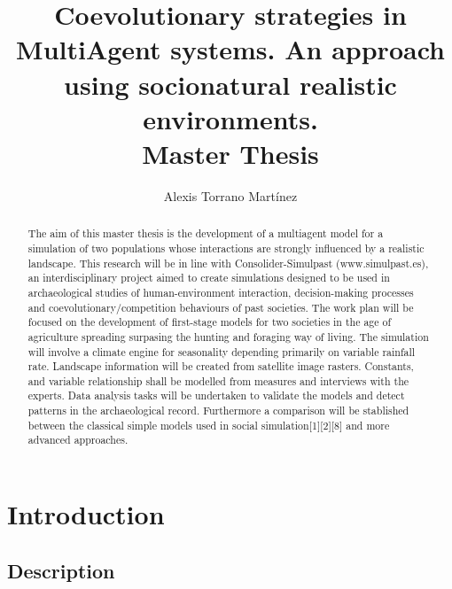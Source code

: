 \documentclass[11pt,oneside,a4paper,openright]{report}
\begin{document}
\title{Coevolutionary strategies in MultiAgent systems. An approach using socionatural realistic environments.\\
\small{Master Thesis}}
\author{Alexis Torrano Mart\'inez}
\maketitle
\newpage



\begin{abstract}
The aim of this master thesis is the development of a multiagent model for a simulation of two populations whose interactions are strongly influenced by a realistic landscape.
This research will be in line with Consolider-Simulpast (www.simulpast.es), an interdisciplinary project aimed to create simulations designed to be used in archaeological studies of human-environment interaction, decision-making processes and coevolutionary/competition behaviours of past societies.
The work plan will be focused on the development of first-stage models for two societies in the age of agriculture spreading surpasing the hunting and foraging way of living. The simulation will involve a climate engine for seasonality depending primarily on variable rainfall rate. Landscape information will be created from satellite image rasters. Constants, and variable relationship shall be modelled from measures and interviews with the experts. Data analysis tasks will be undertaken to validate the models and detect patterns in the archaeological record. Furthermore a comparison will be stablished between the classical simple models used in social simulation[1][2][8] and more advanced approaches.
\end{abstract}
\newpage 

\setcounter{tocdepth}{6}
\tableofcontents
\newpage 

\chapter{Introduction}

\section{Description}
\end{document}
